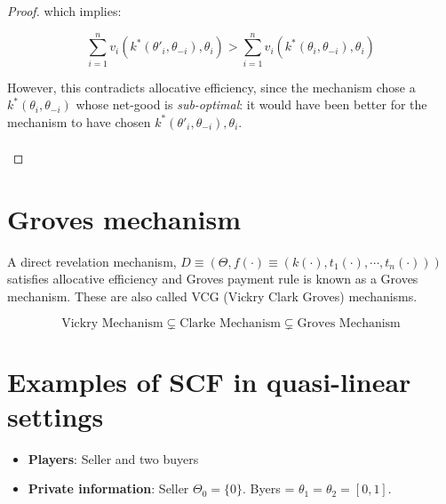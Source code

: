 \documentclass[10pt,a4paper]{article}
\begin{document}
\begin{proof}
    which implies:

    $$
      \sum_{i=1}^n  v_i(k^*(\theta'_i, \theta_{-i}), \theta_i) >
      \sum_{i=1}^n v_i(k^*(\theta_i, \theta_{-i}), \theta_i) 
    $$

    However, this contradicts allocative efficiency, since the mechanism
    chose a $k^*(\theta_i, \theta_{-i}) $ whose net-good is \emph{sub-optimal}:
    it would have been better for the mechanism to have chosen 
    $k^*(\theta'_i, \theta_{-i}), \theta_i$.

    \begin{align*}
    \end{align*}

\end{proof}

\section{Groves mechanism}
A direct revelation mechanism, 
$D \equiv (\Theta, f(\cdot) \equiv (k(\cdot), t_1(\cdot), \cdots, t_n (\cdot)))$ 
satisfies allocative efficiency  and Groves payment rule is known as a Groves
mechanism. These are also called VCG (Vickry Clark Groves) mechanisms.

$$
\text{Vickry Mechanism} \subsetneq \text{Clarke Mechanism} \subsetneq \text{Groves Mechanism}
$$



\section{Examples of SCF in quasi-linear settings}
\begin{itemize}
    \item \textbf{Players}: Seller and two buyers
    \item \textbf{Private information}: Seller $\Theta_0 = \{ 0 \}$. Byers = $\theta_1 =\theta_2 = [0, 1]$.
\end{itemize}
\end{document}
